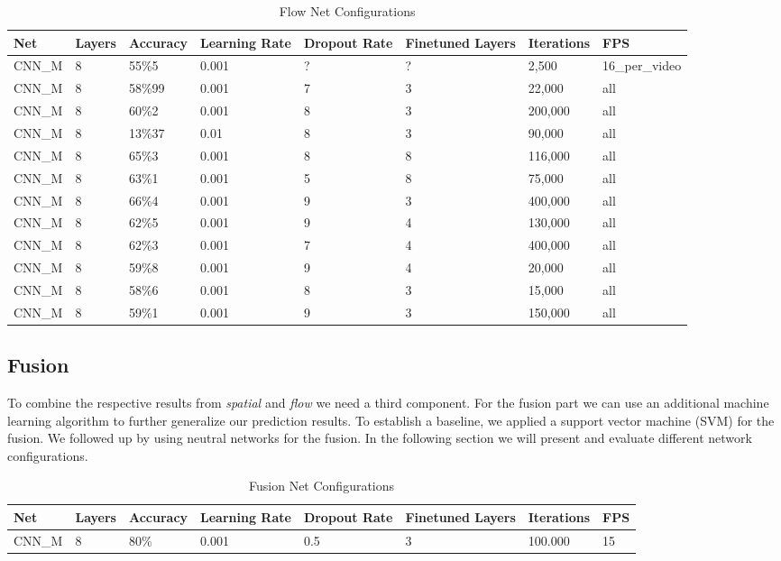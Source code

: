 \begin{table}[H]
\centering
\caption{Flow Net Configurations}
\label{table:flow_results}
\begin{tabularx}{\textwidth}{XXXXXXXX}
\toprule
Net 		& Layers	& Accuracy	& Learning Rate 	& Dropout Rate	& Finetuned Layers	& Iterations	& FPS\\ \midrule

CNN\_M & 8 & 55\%5   & 0.001 & ? & ? & 2,500   & 16\_per\_video \\
CNN\_M & 8 & 58\%99  & 0.001 & 7 & 3 & 22,000  & all \\
CNN\_M & 8 & 60\%2   & 0.001 & 8 & 3 & 200,000 & all \\
CNN\_M & 8 & 13\%37  &  0.01 & 8 & 3 & 90,000  & all \\
CNN\_M & 8 & 65\%3   & 0.001 & 8 & 8 & 116,000 & all \\
CNN\_M & 8 & 63\%1   & 0.001 & 5 & 8 & 75,000  & all \\
CNN\_M & 8 & 66\%4   & 0.001 & 9 & 3 & 400,000 & all \\
CNN\_M & 8 & 62\%5   & 0.001 & 9 & 4 & 130,000 & all \\
CNN\_M & 8 & 62\%3   & 0.001 & 7 & 4 & 400,000 & all \\
CNN\_M & 8 & 59\%8   & 0.001 & 9 & 4 & 20,000  & all \\
CNN\_M & 8 & 58\%6   & 0.001 & 8 & 3 & 15,000  & all \\
CNN\_M & 8 & 59\%1   & 0.001 & 9 & 3 & 150,000 & all \\

\bottomrule
\end{tabularx}
\end{table}

\subsection{Fusion}
\label{subsec:fusion}

To combine the respective results from \emph{spatial} and \emph{flow} we need a third component.
For the fusion part we can use an additional machine learning algorithm to further generalize our prediction results.
To establish a baseline, we applied a support vector machine (SVM) for the fusion.
We followed up by using neutral networks for the fusion.
In the following section we will present and evaluate different network configurations.


\begin{table}[H]
\centering
\caption{Fusion Net Configurations}
\label{table:fusion_results}
\begin{tabularx}{\textwidth}{XXXXXXXX}
\toprule
Net 		& Layers	& Accuracy	& Learning Rate 	& Dropout Rate	& Finetuned Layers	& Iterations	& FPS\\ \midrule
CNN\_M		& 8			& 80\%		& 0.001			 	& 0.5			& 3					& 100.000		& 15\\
\bottomrule
\end{tabularx}
\end{table}


